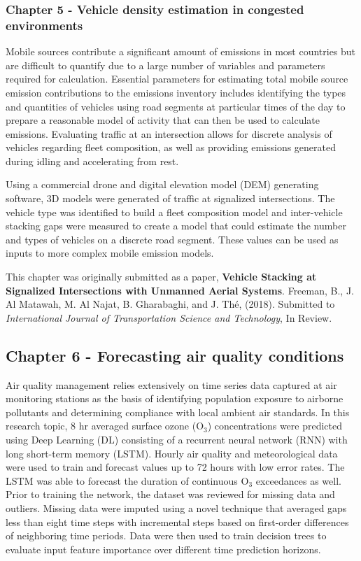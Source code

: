 \subsubsection*{Chapter 5 - Vehicle density estimation in congested environments}

Mobile sources contribute a significant amount of emissions in most countries but are difficult to quantify due to a large number of variables and parameters required for calculation. Essential parameters for estimating total mobile source emission contributions to the emissions inventory includes identifying the types and quantities of vehicles using road segments at particular times of the day to prepare a reasonable model of activity that can then be used to calculate emissions. Evaluating traffic at an intersection allows for discrete analysis of vehicles regarding fleet composition, as well as providing emissions generated during idling and accelerating from rest.

Using a commercial drone and digital elevation model (DEM) generating software, 3D models were generated of traffic at signalized intersections. The vehicle type was identified to build a fleet composition model and inter-vehicle stacking gaps were measured to create a model that could estimate the number and types of vehicles on a discrete road segment. These values can be used as inputs to more complex mobile emission models.

This chapter was originally submitted as a paper, \textbf{Vehicle Stacking at Signalized Intersections with Unmanned Aerial Systems}.  Freeman,  B., J. Al Matawah, M. Al Najat, B. Gharabaghi, and J.  Th\'e, (2018). Submitted to \textit{International Journal of Transportation Science and Technology}, In Review.

\subsection*{Chapter 6 - Forecasting air quality conditions}

Air quality management relies extensively on time series data captured at air monitoring stations as the basis of identifying population exposure to airborne pollutants and determining compliance with local ambient air standards. In this research topic, 8 hr averaged surface ozone (O$_{3}$) concentrations were predicted using Deep Learning (DL) consisting of a recurrent neural network (RNN) with long short-term memory (LSTM). Hourly air quality and meteorological data were used to train and forecast values up to 72 hours with low error rates. The LSTM was able to forecast the duration of continuous O$_{3}$ exceedances as well. Prior to training the network, the dataset was reviewed for missing data and outliers. Missing data were imputed using a novel technique that averaged gaps less than eight time steps with incremental steps based on first-order differences of neighboring time periods. Data were then used to train decision trees to evaluate input feature importance over different time prediction horizons. 


